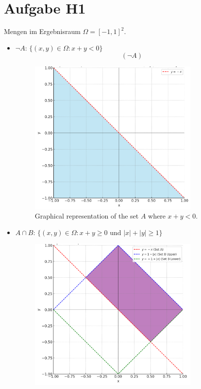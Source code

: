 \documentclass{article}
\begin{document}
\section*{Aufgabe H1}
Mengen im Ergebnisraum $\Omega = [-1, 1]^2$.
\begin{itemize}
    \item $\neg A$: $\{(x, y) \in \Omega : x + y < 0\}$ 
    \[(\neg A)\]
    \begin{figure}[!ht]
        \centering
        \includegraphics[width=0.8\textwidth]{img/h1_a.png}
        \caption{Graphical representation of the set \( A \) where \( x + y < 0 \).}
    \end{figure}
    \item $A \cap B$: $\{(x, y) \in \Omega : x + y \geq 0 \text{ und } |x| + |y| \geq 1\}$
    \begin{figure}[!ht]
        \centering
        \includegraphics[width=0.8\textwidth]{img/h1_b.png}

\end{figure}
\end{itemize}
\end{document}
